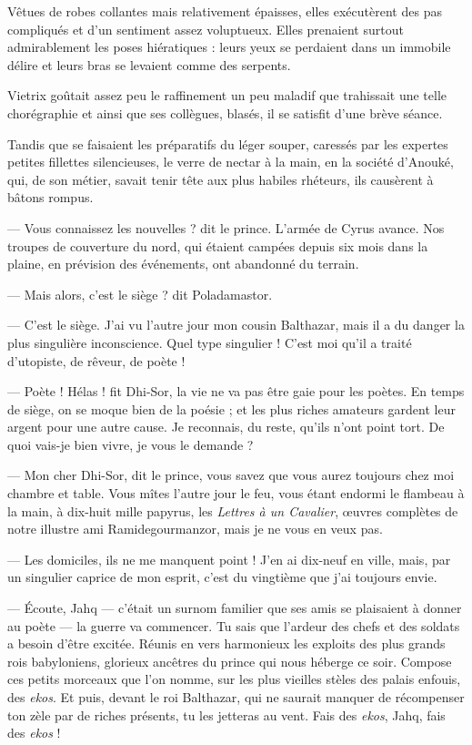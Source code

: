 \documentclass[a4paper, 11pt, oneside, polutonikogreek, french]{article}
\begin{document}
Vêtues de robes collantes mais relativement épaisses, elles exécutèrent des pas compliqués et d'un sentiment assez voluptueux. Elles prenaient surtout admirablement les poses hiératiques : leurs yeux se perdaient dans un immobile délire et leurs bras se levaient comme des serpents.

Vietrix goûtait assez peu le raffinement un peu maladif que trahissait une telle chorégraphie et ainsi que ses collègues, blasés, il se satisfit d'une brève séance.

\bigskip
\centerline{\EightStarTaper}
\centerline{\EightStarTaper\EightStarTaper}
\bigskip

Tandis que se faisaient les préparatifs du léger souper, caressés par les expertes petites fillettes silencieuses, le verre de nectar à la main, en la société d'Anouké, qui, de son métier, savait tenir tête aux plus habiles rhéteurs, ils causèrent à bâtons rompus.

--- Vous connaissez les nouvelles ? dit le prince. L'armée de Cyrus avance. Nos troupes de couverture du nord, qui étaient campées depuis six mois dans la plaine, en prévision des événements, ont abandonné du terrain.

--- Mais alors, c'est le siège ? dit Poladamastor.

--- C'est le siège. J'ai vu l'autre jour mon cousin Balthazar, mais il a du danger la plus singulière inconscience. Quel type singulier ! C'est moi qu'il a traité d'utopiste, de rêveur, de poète !

--- Poète ! Hélas ! fit Dhi-Sor, la vie ne va pas être gaie pour les poètes. En temps de siège, on se moque bien de la poésie ; et les plus riches amateurs gardent leur argent pour une autre cause. Je reconnais, du reste, qu'ils n'ont point tort. De quoi vais-je bien vivre, je vous le demande ?

--- Mon cher Dhi-Sor, dit le prince, vous savez que vous aurez toujours chez moi chambre et table. Vous mîtes l'autre jour le feu, vous étant endormi le flambeau à la main, à dix-huit mille papyrus, les \emph{Lettres à un Cavalier}, œuvres complètes de notre illustre ami Ramidegourmanzor, mais je ne vous en veux pas.

--- Les domiciles, ils ne me manquent point ! J'en ai dix-neuf en ville, mais, par un singulier caprice de mon esprit, c'est du vingtième que j'ai toujours envie.

--- Écoute, Jahq --- c'était un surnom familier que ses amis se plaisaient à donner au poète --- la guerre va commencer. Tu sais que l'ardeur des chefs et des soldats a besoin d'être excitée. Réunis en vers harmonieux les exploits des plus grands rois babyloniens, glorieux ancêtres du prince qui nous héberge ce soir. Compose ces petits morceaux que l'on nomme, sur les plus vieilles stèles des palais enfouis, des \emph{ekos}. Et puis, devant le roi Balthazar, qui ne saurait manquer de récompenser ton zèle par de riches présents, tu les jetteras au vent. Fais des \emph{ekos}, Jahq, fais des \emph{ekos} !
\end{document}
